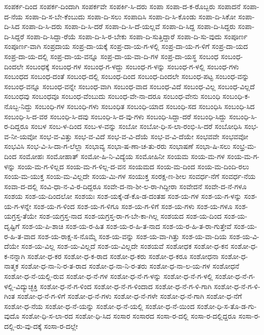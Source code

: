 {ಸಂಪರ್ಕ-ದಿಂದ
ಸಂಪರ್ಕ-ದಿಂದಾಗಿ
ಸಂಪರ್ಕವೇ
ಸಂಪರ್ಕಿ-ಸಿ-ದರು
ಸಂಪಾ
ಸಂಪಾ-ದ-ಕ-ರೊಬ್ಬರು
ಸಂಪಾದನೆ
ಸಂಪಾ-ದ-ನೆಯ
ಸಂಪಾ-ದಿ-ಸ-ಬೇ-ಕೆಂಬುದು
ಸಂಪಾ-ದಿ-ಸಲು
ಸಂಪಾದಿಸಿ
ಸಂಪಾ-ದಿ-ಸಿ-ಕೊಂಡು
ಸಂಪಾ-ದಿ-ಸಿಕೋ
ಸಂಪಾ-ದಿ-ಸಿದ
ಸಂಪಾ-ದಿ-ಸಿ-ದರು
ಸಂಪಾ-ದಿ-ಸಿ-ದರೆ
ಸಂಪಾ-ದಿ-ಸಿ-ದೆ-ಯಲ್ಲವೆ
ಸಂಪಾ-ದಿ-ಸಿದ್ದ
ಸಂಪಾ-ದಿ-ಸಿದ್ದರು
ಸಂಪಾ-ದಿ-ಸಿದ್ದರೆ
ಸಂಪಾ-ದಿ-ಸಿದ್ದಾ-ರೆಯೆ
ಸಂಪಾ-ದಿ-ಸಿ-ರ-ಬೇಕು
ಸಂಪಾ-ದಿ-ಸುತ್ತಿದ್ದಾರೆ
ಸಂಪಾ-ದಿ-ಸು-ವುದು
ಸಂಪೂರ್ಣ
ಸಂಪೂರ್ಣ-ವಾಗಿ
ಸಂಪ್ರದಾಯ
ಸಂಪ್ರ-ದಾ-ಯಕ್ಕೆ
ಸಂಪ್ರ-ದಾ-ಯ-ಗ-ಳಲ್ಲಿ
ಸಂಪ್ರ-ದಾ-ಯ-ಗ-ಳಿಗೆ
ಸಂಪ್ರ-ದಾ-ಯದ
ಸಂಪ್ರ-ದಾ-ಯ-ದಲ್ಲಿ
ಸಂಪ್ರ-ದಾ-ಯ-ವನ್ನೂ
ಸಂಪ್ರ-ದಾ-ಯ-ವಾ-ದಿ-ಗಳ
ಸಂಪ್ರ-ದಾ-ಯಸ್ಥ
ಸಂಬಂಧ
ಸಂಬಂಧ-ದಿಂದಲೇ
ಸಂಬಂಧಕ್ಕೆ
ಸಂಬಂಧ-ಗಳ
ಸಂಬಂಧ-ಗ-ಳದ್ದು
ಸಂಬಂಧ-ಗ-ಳನ್ನು
ಸಂಬಂಧ-ಗ-ಳಲ್ಲಿ
ಸಂಬಂಧ-ಗಳು
ಸಂಬಂಧದ
ಸಂಬಂಧ-ದಂತೆ
ಸಂಬಂಧ-ದಲ್ಲಿ
ಸಂಬಂಧ-ದಿಂದ
ಸಂಬಂಧ-ದಿಂದಲೇ
ಸಂಬಂಧ-ಪಟ್ಟ
ಸಂಬಂಧ-ವನ್ನು
ಸಂಬಂಧ-ವನ್ನೂ
ಸಂಬಂಧ-ವನ್ನೇ
ಸಂಬಂಧ-ವಾಗಿ
ಸಂಬಂಧ-ವಾದ
ಸಂಬಂಧ-ವಿದೆ
ಸಂಬಂಧ-ವಿಲ್ಲ
ಸಂಬಂಧ-ವಿಲ್ಲದೆ
ಸಂಬಂಧವು
ಸಂಬಂಧವೂ
ಸಂಬಂಧ-ವೆಂಬುದು
ಸಂಬಂಧ-ವೇ-ನಾ-ದರೂ
ಸಂಬಂಧ-ವೇನು
ಸಂಬಂಧಿ
ಸಂಬಂಧಿ-ಕ-ನೊಬ್ಬ-ನಿದ್ದು
ಸಂಬಂಧಿ-ಗಳ
ಸಂಬಂಧಿ-ಗಳು
ಸಂಬಂಧಿತ
ಸಂಬಂಧಿ-ಯಾದ
ಸಂಬಂಧಿ-ಸದ
ಸಂಬಂಧಿಸಿ
ಸಂಬಂಧಿ-ಸಿದ
ಸಂಬಂಧಿ-ಸಿ-ದ-ವರ
ಸಂಬಂಧಿ-ಸಿ-ದವು
ಸಂಬಂಧಿ-ಸಿ-ದ-ವು-ಗಳು
ಸಂಬಂಧಿ-ಸಿದ್ದಾ-ದರೆ
ಸಂಬಂಧಿ-ಸಿದ್ದು
ಸಂಬಂಧಿ-ಸಿ-ರ-ದಿದ್ದರೂ
ಸಂಬಳ
ಸಂಬ-ಳ-ದಿಂದ
ಸಂಬ-ಳ-ವನ್ನು
ಸಂಬೋ
ಸಂಬೋ-ಧಿ-ಸ-ಲಾ-ರಂಭಿ-ಸಿ-ದರೆ
ಸಂಬೋಧಿಸಿ
ಸಂಭ-ವ-ನೀ-ಯವೋ
ಸಂಭ-ವ-ವಿತ್ತು
ಸಂಭ-ವ-ವಿದೆ
ಸಂಭ-ವ-ವಿ-ದೆಯೆ
ಸಂಭ-ವ-ವಿ-ದೆಯೇ
ಸಂಭವವೇ
ಸಂಭವವೋ
ಸಂಭವಿಸಿ
ಸಂಭ-ವಿ-ಸಿ-ದಾ-ಗ-ಲೆಲ್ಲಾ
ಸಂಭಾವ್ಯ
ಸಂಭಾ-ಷ-ಣಾ-ಚ-ತು-ರರು
ಸಂಭಾಷಣೆ
ಸಂಭಾ-ಷಿ-ಸಲು
ಸಂಭ್ರ-ಮ-ದಿಂದ
ಸಂಮೋಹಃ
ಸಂಮೋಹಾತ್
ಸಂಮೋ-ಹಿ-ನಿ-ವಿದ್ಯೆಯ
ಸಂಮೋಹಿನೀ
ಸಂಯಮ
ಸಂಯ-ಮ-ಗಳ
ಸಂಯ-ಮ-ಗ-ಳನ್ನು
ಸಂಯ-ಮ-ಗ-ಳಿಲ್ಲದ
ಸಂಯ-ಮ-ಗ-ಳಿಲ್ಲ-ದ-ವನ
ಸಂಯಮದ
ಸಂಯ-ಮ-ದಿಂದ
ಸಂಯ-ಮ-ದಿಂದಿ-ರಲು
ಸಂಯ-ಮ-ಯುಕ್ತ
ಸಂಯ-ಮ-ವಿಲ್ಲದೇ
ಸಂಯ-ಮಿ-ಗಳ
ಸಂಯುಕ್ತ
ಸಂರಕ್ಷ-ಣ-ಶೀಲ
ಸಂವರ್ಧ-ನೆಗೆ
ಸಂವರ್ಧ-ನೆಯ
ಸಂವಾ-ದ-ದಲ್ಲಿ
ಸಂವಿ-ಧಾ-ನ-ವಿ-ರ-ದಿದ್ದರೂ
ಸಂವೇ-ದ-ನಾ-ಶೀ-ಲ-ರಾ-ಗಿದ್ದೀರಾ
ಸಂವೇದನೆ
ಸಂವೇ-ದ-ನೆ-ಗಳೂ
ಸಂಶಯ
ಸಂಶ-ಯ-ದಿಂದಲೋ
ಸಂಶಯಃ
ಸಂಶ-ಯಕ್ಕೆ-ಡೆ-ಕೊ-ಡ-ದಂತಹ
ಸಂಶ-ಯ-ಗಳ
ಸಂಶ-ಯ-ಗ-ಳನ್ನು
ಸಂಶ-ಯ-ಗ-ಳನ್ನೇ
ಸಂಶ-ಯ-ಗ-ಳಿಂದ
ಸಂಶ-ಯ-ಗ-ಳಿಗೂ
ಸಂಶ-ಯ-ಗ-ಳಿಗೆ
ಸಂಶ-ಯ-ಗಳು
ಸಂಶ-ಯ-ಗಳೂ
ಸಂಶ-ಯಗ್ರಸ್ತ-ತೆಯೇ
ಸಂಶ-ಯಗ್ರಸ್ತ-ನಾದ
ಸಂಶ-ಯಗ್ರಸ್ತ-ರಾ-ಗ-ಬೇ-ಕಾ-ಗಿಲ್ಲ
ಸಂಶಯದ
ಸಂಶ-ಯ-ದಿಂದ
ಸಂಶ-ಯ-ದೃಷ್ಟಿಗೆ
ಸಂಶ-ಯ-ಪಿ-ಶಾಚಿ
ಸಂಶ-ಯ-ರ-ಹಿತ
ಸಂಶ-ಯ-ರ-ಹಿ-ತ-ನಾದ
ಸಂಶ-ಯ-ರ-ಹಿ-ತ-ರಾ-ಗುತ್ತೇವೆ
ಸಂಶ-ಯ-ರ-ಹಿ-ತ-ವಾದ
ಸಂಶ-ಯ-ರಾಕ್ಷ-ಸ-ನೊಮ್ಮೆ
ಸಂಶ-ಯ-ವನ್ನು
ಸಂಶ-ಯ-ವಾ-ಗಿತ್ತು
ಸಂಶ-ಯ-ವಾ-ದಿಯ
ಸಂಶ-ಯ-ವಿ-ದೆಯೇ
ಸಂಶ-ಯ-ವಿಲ್ಲ
ಸಂಶ-ಯ-ವಿಲ್ಲದೆ
ಸಂಶ-ಯ-ವಿಲ್ಲದೇ
ಸಂಶಯವೆ
ಸಂಶೋಧಕ
ಸಂಶೋ-ಧ-ಕನ
ಸಂಶೋ-ಧ-ಕ-ನನ್ನಾಗಿ
ಸಂಶೋ-ಧ-ಕರ
ಸಂಶೋ-ಧ-ಕ-ರಾದ
ಸಂಶೋ-ಧ-ಕರು
ಸಂಶೋ-ಧ-ಕರೂ
ಸಂಶೋಧನಾ
ಸಂಶೋ-ಧ-ನಾತ್ಮಕ
ಸಂಶೋ-ಧ-ನಾ-ನಿ-ರ-ತ-ರಾದ
ಸಂಶೋ-ಧ-ನಾ-ನಿ-ರ-ತರು
ಸಂಶೋ-ಧ-ನಾ-ಲ-ಯ-ಗಳ
ಸಂಶೋಧನೆ
ಸಂಶೋ-ಧ-ನೆ-ಯಲ್ಲಿ-ರುವ
ಸಂಶೋ-ಧ-ನೆ-ಗಳ
ಸಂಶೋ-ಧ-ನೆ-ಗ-ಳನ್ನು
ಸಂಶೋ-ಧ-ನೆ-ಗ-ಳಲ್ಲಿ
ಸಂಶೋ-ಧ-ನೆ-ಗ-ಳಲ್ಲಿ-ವಿದ್ಯುಚ್ಛಕ್ತಿ
ಸಂಶೋ-ಧ-ನೆ-ಗ-ಳಿಂದ
ಸಂಶೋ-ಧ-ನೆ-ಗ-ಳಿಂದಾದ
ಸಂಶೋ-ಧ-ನೆ-ಗ-ಳಿ-ಗಾಗಿ
ಸಂಶೋ-ಧ-ನೆ-ಗ-ಳಿ-ಗಿಂತ
ಸಂಶೋ-ಧ-ನೆ-ಗ-ಳಿಗೆ
ಸಂಶೋ-ಧ-ನೆ-ಗಳು
ಸಂಶೋ-ಧ-ನೆ-ಗಳೇ
ಸಂಶೋ-ಧ-ನೆ-ಗಾಗಿ
ಸಂಶೋ-ಧ-ನೆಗೆ
ಸಂಶೋ-ಧ-ನೆಯ
ಸಂಶೋ-ಧ-ನೆ-ಯನ್ನು
ಸಂಶೋ-ಧ-ನೆ-ಯಲ್ಲಿ
ಸಂಶೋ-ಧ-ನೆ-ಯಿಂದ
ಸಂಶೋ-ಧಿ-ಸ-ತೊ-ಡ-ಗು-ವುದೊ
ಸಂಶೋ-ಧಿ-ಸ-ಲಾ-ರದ
ಸಂಶೋ-ಧಿ-ಸಿದ
ಸಂಸಾರ
ಸಂಸಾರದ
ಸಂಸಾ-ರ-ದಲ್ಲಿ
ಸಂಸಾ-ರ-ದಲ್ಲಿದ್ದರೂ
ಸಂಸಾ-ರ-ದಲ್ಲಿ-ರು-ವು-ದಕ್ಕೆ
ಸಂಸಾ-ರ-ದಲ್ಲೇ
}
